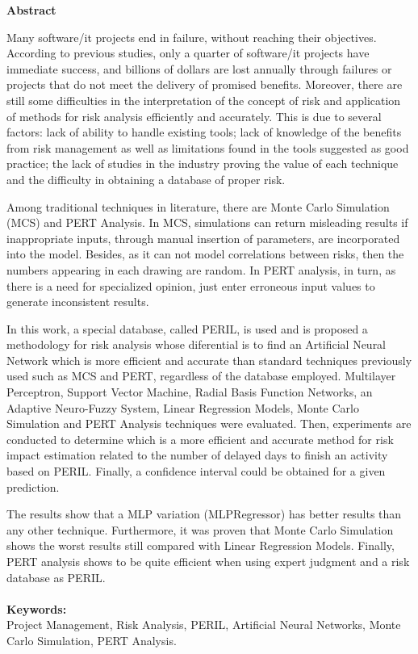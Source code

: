 \begin{flushbottom}
\begin{flushleft}
{\huge \textbf{Abstract}}
\linebreak
\end{flushleft}
Many software/it projects end in failure, without reaching their objectives. According to previous studies, only a quarter of software/it projects have immediate success, and billions of dollars are lost annually through failures or projects that do not meet the delivery of promised benefits. Moreover, there are still some difficulties in the interpretation of the concept of risk and application of methods for risk analysis efficiently and accurately. This is due to several factors: lack of ability to handle existing tools; lack of knowledge of the benefits from risk management as well as limitations found in the tools suggested as good practice; the lack of studies in the industry proving the value of each technique and the difficulty in obtaining a database of proper risk. 

Among traditional techniques in literature, there are Monte Carlo Simulation (MCS) and PERT Analysis. In MCS, simulations can return misleading results if inappropriate inputs, through manual insertion of parameters, are incorporated into the model. Besides, as it can not model correlations between risks, then the numbers appearing in each drawing are random. In PERT analysis, in turn, as there is a need for specialized opinion, just enter erroneous input values to generate inconsistent results.

In this work, a special database, called PERIL, is used and is proposed a methodology for risk analysis whose diferential is to find an Artificial Neural Network which is more efficient and accurate than standard techniques previously used such as MCS and PERT, regardless of the database employed. Multilayer Perceptron, Support Vector Machine, Radial Basis Function Networks, an Adaptive Neuro-Fuzzy System, Linear Regression Models, Monte Carlo Simulation and PERT Analysis techniques were evaluated. Then, experiments are conducted to determine which is a more efficient and accurate method for risk impact estimation related to the number of delayed days to finish an activity based on PERIL. Finally, a confidence interval could be obtained for a given prediction. 

The results show that a MLP variation (MLPRegressor) has better results than any other technique. Furthermore, it was proven that Monte Carlo Simulation shows the worst results still compared with Linear Regression Models. Finally, PERT analysis shows to be quite efficient when using expert judgment and a risk database as PERIL.
\\
\\
\textbf{Keywords:} \\ Project Management, Risk Analysis, PERIL, Artificial Neural Networks, Monte Carlo Simulation, PERT Analysis.\end{flushbottom}
\newpage

